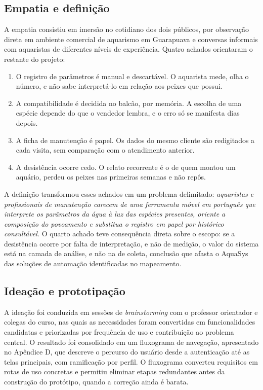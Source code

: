 \documentclass[12pt,oneside,a4paper,brazilian]{abntex2}
\begin{document}
\subsection{Empatia e definição}
A empatia consistiu em imersão no cotidiano dos dois públicos, por observação direta em ambiente comercial de aquarismo em Guarapuava e conversas informais com aquaristas de diferentes níveis de experiência. Quatro achados orientaram o restante do projeto:

\begin{enumerate}
  \item O registro de parâmetros é manual e descartável. O aquarista mede, olha o número, e não sabe interpretá-lo em relação aos peixes que possui.
  \item A compatibilidade é decidida no balcão, por memória. A escolha de uma espécie depende do que o vendedor lembra, e o erro só se manifesta dias depois.
  \item A ficha de manutenção é papel. Os dados do mesmo cliente são redigitados a cada visita, sem comparação com o atendimento anterior.
  \item A desistência ocorre cedo. O relato recorrente é o de quem montou um aquário, perdeu os peixes nas primeiras semanas e não repôs.
\end{enumerate}
A definição transformou esses achados em um problema delimitado: \textit{aquaristas e profissionais de manutenção carecem de uma ferramenta móvel em português que interprete os parâmetros da água à luz das espécies presentes, oriente a composição do povoamento e substitua o registro em papel por histórico consultável.} O quarto achado teve consequência direta sobre o escopo: se a desistência ocorre por falta de interpretação, e não de medição, o valor do sistema está na camada de análise, e não na de coleta, conclusão que afasta o AquaSys das soluções de automação identificadas no mapeamento.


\subsection{Ideação e prototipação}
A ideação foi conduzida em sessões de \textit{brainstorming} com o professor orientador e colegas do curso, nas quais as necessidades foram convertidas em funcionalidades candidatas e priorizadas por frequência de uso e contribuição ao problema central. O resultado foi consolidado em um fluxograma de navegação, apresentado no Apêndice D, que descreve o percurso do usuário desde a autenticação até as telas principais, com ramificação por perfil. O fluxograma converteu requisitos em rotas de uso concretas e permitiu eliminar etapas redundantes antes da construção do protótipo, quando a correção ainda é barata.
\end{document}
